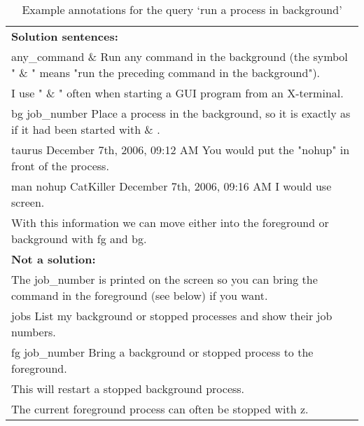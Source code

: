 \documentclass[11pt]{article}
\begin{document}
\begin{table*}
\small{        %
\begin{tabular}{l} 
{\bf Solution sentences:}\\  
any\_command \& Run any command in the background (the symbol " \& " means "run the preceding command in the background").\\
I use " \& " often when starting a GUI program from an X-terminal.\\
bg job\_number Place a process in the background, so it is exactly as if it had been started with \& .\\
taurus December 7th, 2006, 09:12 AM You would put the "nohup" in front of the process.\\
man nohup CatKiller December 7th, 2006, 09:16 AM I would use screen.\\
With this information we can move either into the foreground or background with fg and bg.\\
\hline
{\bf Not a solution:}\\
The job\_number is printed on the screen so you can bring the command in the foreground (see below) if you want.\\
jobs List my background or stopped processes and show their job numbers.\\
fg job\_number Bring a background or stopped process to the foreground.\\
This will restart a stopped background process.\\
The current foreground process can often be stopped with z.\\
\end{tabular}
}
\caption{Example annotations for the query `run a process in background'}
\label{tab:sents}
\end{table*}
\end{document}
